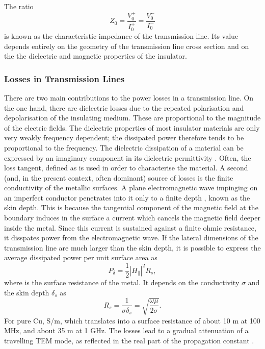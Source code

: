The ratio
%
\begin{equation}
Z_0 = \frac{V_0^+}{I_0^+} = \frac{V_0^-}{I_0^-}
\end{equation}
%
is known as the characteristic impedance of the transmission line. Its
value depends entirely on the geometry of the transmission line cross
section and on the the dielectric and magnetic properties of the
insulator.



\subsubsection{Losses in Transmission
Lines}\label{losses-in-transmission-lines}

There are two main contributions to the power losses in a transmission
line. On the one hand, there are dielectric losses due to the repeated
polarisation and depolarisation of the insulating medium. These are
proportional to the magnitude of the electric fields. The dielectric
properties of most insulator materials are only very weakly frequency
dependent; the dissipated power therefore tends to be proportional to
the frequency. The dielectric dissipation of a material can be expressed
by an imaginary component in its dielectric permittivity
. Often, the loss tangent, defined
as  is used in order to characterise
the material. A second (and, in the present context, often
dominant) source of losses is the finite conductivity of the metallic surfaces.
A plane electromagnetic wave impinging on an imperfect
conductor penetrates into it only to a finite depth , known as
the skin depth. This is because the tangential component of the magnetic
field at the boundary induces in the surface a current which cancels the
magnetic field deeper inside the metal. Since this current is sustained
against a finite ohmic resistance, it disspates power from the electromagnetic wave. 
If the lateral dimensions of the transmission line are much larger
than the skin depth, it is possible to express the average dissipated power per
unit surface area as
%
\begin{equation}
P_\delta = \frac{1}{2}|H_\parallel|^2 R_s,
\end{equation}
%
where  is the surface resistance of the metal. It depends on the
conductivity $\sigma$ and the skin depth $\delta_s$ as
%
\begin{equation}
R_s = \frac{1}{\sigma \delta_s} = \sqrt{\frac{\omega\mu}{2\sigma}}.
\end{equation}
%
For pure Cu, S/m, which translates
into a surface resistance of about 10 m\m{\Omega} at 100 MHz, and about
35 m\m{\Omega} at 1 GHz. The losses lead to a gradual attenuation of a
travelling TEM mode, as reflected in the real part of the propagation
constant \m{\gamma}.


